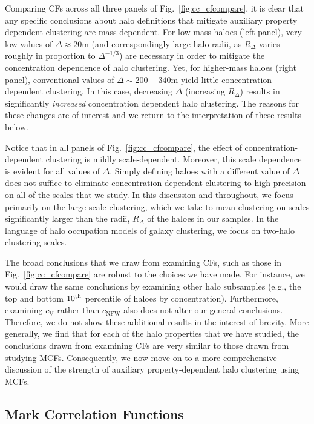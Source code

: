 \documentclass[usenatbib,fleqn]{mnras}
\begin{document}
Comparing CFs across all three panels of Fig.~\ref{fig:cc_cfcompare}, it is clear that any specific conclusions about halo definitions that mitigate auxiliary property dependent clustering are mass dependent. For low-mass haloes (left panel), very low values of $\Delta \approx 20$m (and correspondingly large halo radii, as $R_{\Delta}$ varies roughly in proportion to $\Delta^{-1/3}$) are necessary in order to mitigate the concentration dependence of halo clustering. Yet, for higher-mass haloes (right panel), conventional values of $\Delta \sim 200-340$m yield little concentration-dependent clustering. In this case, decreasing $\Delta$ (increasing $R_{\Delta}$) results in significantly {\em increased} concentration dependent halo clustering. The reasons for 
these changes are of interest and we return to the interpretation of these results below.

Notice that in all panels of Fig.~\ref{fig:cc_cfcompare}, the effect of concentration-dependent clustering is mildly scale-dependent. Moreover, this scale dependence is evident for all values of $\Delta$. Simply defining haloes with a different value of $\Delta$ does not suffice to eliminate concentration-dependent clustering to high precision on all of the scales that we study. In this discussion and throughout, we focus primarily on the large scale clustering, which we take to mean clustering on scales significantly larger than the radii, $R_{\Delta}$ of the haloes in our samples. In the language of halo occupation models of galaxy clustering, we focus on two-halo clustering scales.

The broad conclusions that we draw from examining CFs, such as those in Fig.~\ref{fig:cc_cfcompare} are robust to the choices we have made. For instance, we would draw the same conclusions by examining other halo subsamples (e.g., the top and bottom $10^{\rm{th}}$ percentile of haloes by concentration). Furthermore, examining $c_{\mathrm{V}}$ rather than $c_{\mathrm{NFW}}$ also does not alter our general conclusions. Therefore, we do not show these additional results in the interest of brevity. More generally, we find that for each of the halo properties that we have studied, the conclusions drawn from examining CFs are very similar to those drawn from studying MCFs. Consequently, we now move on to a more comprehensive discussion of the strength of auxiliary property-dependent halo clustering using MCFs. 

\subsection{Mark Correlation Functions}
\label{sub:mcfresults}
\end{document}
